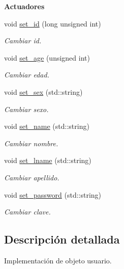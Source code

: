 \begin{Indent}{\bf Actuadores}\par
\begin{DoxyCompactItemize}
\item 
void \hyperlink{class_cuser_af24e3067528b741a49410b0372f4ef42}{set\+\_\+id} (long unsigned int)
\begin{DoxyCompactList}\small\item\em Cambiar id. \end{DoxyCompactList}\item 
void \hyperlink{class_cuser_a21de7d9c58f6128adc959e2c008b7deb}{set\+\_\+age} (unsigned int)
\begin{DoxyCompactList}\small\item\em Cambiar edad. \end{DoxyCompactList}\item 
void \hyperlink{class_cuser_a5e3c1e2f75f9638714423f1372ea098a}{set\+\_\+sex} (std\+::string)
\begin{DoxyCompactList}\small\item\em Cambiar sexo. \end{DoxyCompactList}\item 
void \hyperlink{class_cuser_a54a15a99fc54cd882e87bb1ba66c3434}{set\+\_\+name} (std\+::string)
\begin{DoxyCompactList}\small\item\em Cambiar nombre. \end{DoxyCompactList}\item 
void \hyperlink{class_cuser_a4062d5c81e4aafbb7ac0b9256df66b71}{set\+\_\+lname} (std\+::string)
\begin{DoxyCompactList}\small\item\em Cambiar apellido. \end{DoxyCompactList}\item 
void \hyperlink{class_cuser_ab1b88a55109edbfb16d6c05fc093fd1e}{set\+\_\+password} (std\+::string)
\begin{DoxyCompactList}\small\item\em Cambiar clave. \end{DoxyCompactList}\end{DoxyCompactItemize}
\end{Indent}


\subsection{Descripción detallada}
Implementación de objeto usuario. 

